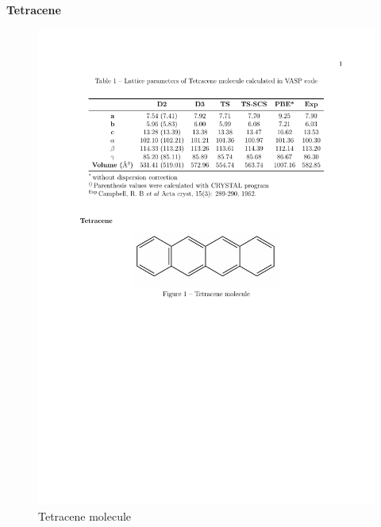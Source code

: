 \documentclass[12pt,a4paper,openany]{book}
\begin{document}
	
	\textbf{Tetracene}
	
	\begin{figure}[h]
		\centering
		\includegraphics[scale=0.2]{tetracene}
		\caption{Tetracene molecule}
	\end{figure} 
 
\end{document}
